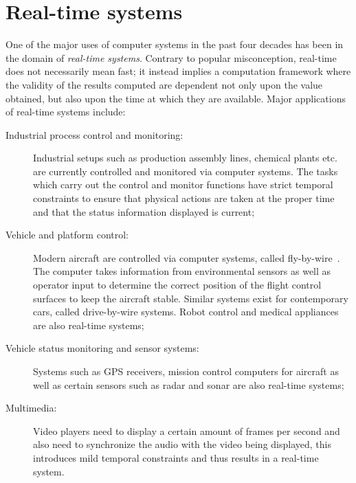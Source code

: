 \section{Real-time systems}
One of the major uses of computer systems in the past four decades has
been in the domain of \emph{real-time systems}. Contrary to popular
misconception, real-time does not necessarily mean fast; it instead
implies a computation framework where the validity of the results
computed are dependent not only upon the value obtained, but also upon
the time at which they are available. Major applications of real-time
systems include:

\begin{description}
\item[Industrial process control and monitoring:]{Industrial setups
  such as production assembly lines, chemical plants etc. are
  currently controlled and monitored via computer systems. The tasks
  which carry out the control and monitor functions have strict
  temporal constraints to ensure that physical actions are taken at
  the proper time and that the status information displayed is current;}
\item[Vehicle and platform control:]{Modern aircraft are controlled
  via computer systems, called fly-by-wire~\cite{langer@rtsep92}. The
  computer takes information from environmental sensors as well as
  operator input to determine the correct position of the flight
  control surfaces to keep the aircraft stable. Similar systems exist
  for contemporary cars, called drive-by-wire systems. Robot control
  and medical appliances are also real-time systems;}
\item[Vehicle status monitoring and sensor systems:]{Systems such as GPS
  receivers, mission control computers for aircraft as well as certain
  sensors such as radar and sonar are also real-time systems;}
\item[Multimedia:]{Video players need to display a certain amount of
  frames per second and also need to synchronize the audio with the
  video being displayed, this introduces mild temporal constraints and
  thus results in a real-time system.}
\end{description}

